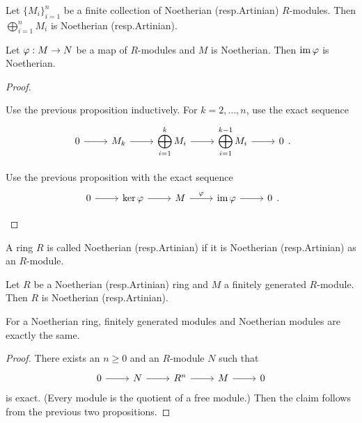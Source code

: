 \begin{cor}[3.4]
  \lv
  \begin{enum}
    \io
    Let $\{M_i\}_{i=1}^n$ be a finite collection of Noetherian (resp.\@ Artinian) $R$-modules.
    Then $\bigoplus_{i=1}^n M_i$ is Noetherian (resp.\@ Artinian).

    \io
    Let $\varphi: M \to N$ be a map of $R$-modules and $M$ is Noetherian.
    Then $\operatorname{im}\varphi$ is Noetherian.
  \end{enum}
\end{cor}

\begin{proof}
  \lv
  \begin{enum}
    \io
    Use the previous proposition inductively.
    For $k=2,\ldots,n$, use the exact sequence
    \begin{equation*}
      \begin{tikzcd}
	0 \ar[r] & M_k \ar[r] & \ds \bigoplus_{i=1}^k M_i \ar[r] & \ds \bigoplus_{i=1}^{k-1} M_i \ar[r] & 0
      \end{tikzcd}
      .
    \end{equation*}

    \io
    Use the previous proposition with the exact sequence
    \begin{equation*}
      \begin{tikzcd}
	0 \ar[r] & \ker\ph \ar[r] & M \ar[r, "\ph"] & \im\ph \ar[r] & 0
      \end{tikzcd}
      .
      \qedhere
    \end{equation*}
  \end{enum}
\end{proof}

\begin{defn}[3.5]
  A ring $R$ is called Noetherian (resp.\@ Artinian) if it is Noetherian (resp.\@ Artinian) as an $R$-module.  
\end{defn}

\begin{prop}[3.6]
  Let $R$ be a Noetherian (resp.\@ Artinian) ring and $M$ a finitely generated $R$-module.
  Then $R$ is Noetherian (resp.\@ Artinian).
\end{prop}

\begin{rmk}
  For a Noetherian ring, finitely generated modules and Noetherian modules are exactly the same.
\end{rmk}

\begin{proof}
  There exists an $n \geq 0$ and an $R$-module $N$ such that
  \begin{equation*}
    \begin{tikzcd}
      0 \ar[r] & N \ar[r] & R^n \ar[r] & M \ar[r] & 0
    \end{tikzcd}
  \end{equation*}
  is exact.
  (Every module is the quotient of a free module.)
  Then the claim follows from the previous two propositions.
\end{proof}

